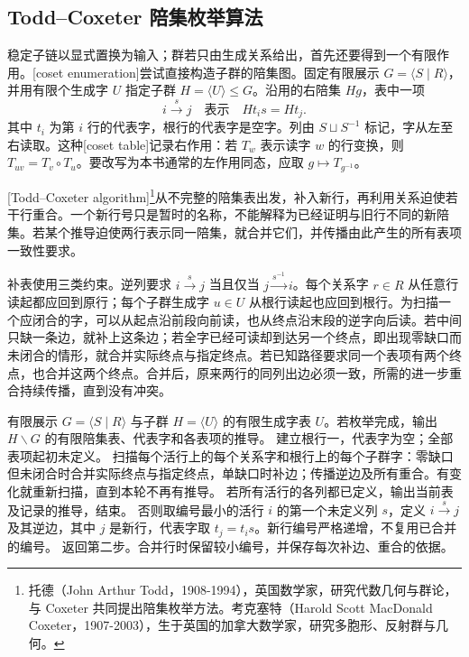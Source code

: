 \subsection{Todd–Coxeter 陪集枚举算法}
\label{b1:subsec:C03:05}

稳定子链以显式置换为输入；群若只由生成关系给出，首先还要得到一个有限作用。[coset enumeration]尝试直接构造子群的陪集图。固定有限展示 \(G=\langle S\mid R\rangle\)，并用有限个生成字 \(U\) 指定子群 \(H=\langle U\rangle\leq G\)。沿用的右陪集 \(Hg\)，表中一项
\[
	i\mathbin{\xrightarrow{s}}j
	\quad\text{表示}\quad Ht_i s=Ht_j.
\]
其中 \(t_i\) 为第 \(i\) 行的代表字，根行的代表字是空字。列由 \(S\sqcup S^{-1}\) 标记，字从左至右读取。这种[coset table]记录右作用：若 \(T_w\) 表示读字 \(w\) 的行变换，则 \(T_{uv}=T_v\circ T_u\)。要改写为本书通常的左作用同态，应取 \(g\mapsto T_{g^{-1}}\)。

\ProseParagraphBreak
{}[Todd--Coxeter algorithm]\footnote{托德（John Arthur Todd，1908-1994），英国数学家，研究代数几何与群论，与 Coxeter 共同提出陪集枚举方法。考克塞特（Harold Scott MacDonald Coxeter，1907-2003），生于英国的加拿大数学家，研究多胞形、反射群与几何。}从不完整的陪集表出发，补入新行，再利用关系迫使若干行重合。一个新行号只是暂时的名称，不能解释为已经证明与旧行不同的新陪集。若某个推导迫使两行表示同一陪集，就合并它们，并传播由此产生的所有表项一致性要求。

\ProseParagraphBreak
补表使用三类约束。逆列要求 \(i\xrightarrow{s}j\) 当且仅当 \(j\xrightarrow{s^{-1}}i\)。每个关系字 \(r\in R\) 从任意行读起都应回到原行；每个子群生成字 \(u\in U\) 从根行读起也应回到根行。为扫描一个应闭合的字，可以从起点沿前段向前读，也从终点沿末段的逆字向后读。若中间只缺一条边，就补上这条边；若全字已经可读却到达另一个终点，即出现零缺口而未闭合的情形，就合并实际终点与指定终点。若已知路径要求同一个表项有两个终点，也合并这两个终点。合并后，原来两行的同列出边必须一致，所需的进一步重合持续传播，直到没有冲突。

\begin{algorithm}[htbp]
	\caption{公平补边的 Todd--Coxeter 枚举}
	\label{b1:alg:C-todd-coxeter}
	\begin{algorithmsteps}{有限展示 \(G=\langle S\mid R\rangle\) 与子群 \(H=\langle U\rangle\) 的有限生成字表 \(U\)。}{若枚举完成，输出 \(H\backslash G\) 的有限陪集表、代表字和各表项的推导。}
		\State 建立根行一，代表字为空；全部表项起初未定义。
		\State 扫描每个活行上的每个关系字和根行上的每个子群字：零缺口但未闭合时合并实际终点与指定终点，单缺口时补边；传播逆边及所有重合。有变化就重新扫描，直到本轮不再有推导。
		\State 若所有活行的各列都已定义，输出当前表及记录的推导，结束。
		\State 否则取编号最小的活行 \(i\) 的第一个未定义列 \(s\)，定义 \(i\xrightarrow{s}j\) 及其逆边，其中 \(j\) 是新行，代表字取 \(t_j=t_i s\)。新行编号严格递增，不复用已合并的编号。
		\State 返回第二步。合并行时保留较小编号，并保存每次补边、重合的依据。
	\end{algorithmsteps}
\end{algorithm}

